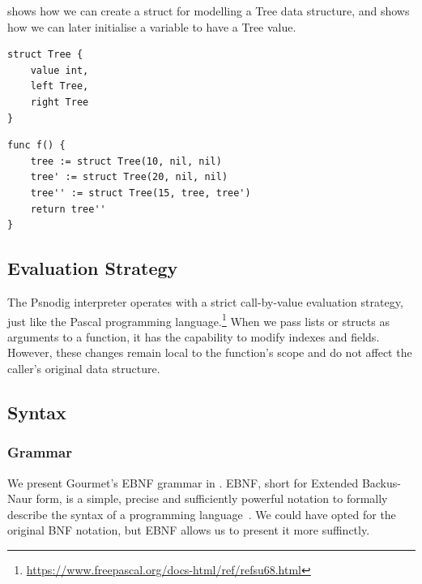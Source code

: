  shows how we can create a struct for modelling a Tree data structure, and  shows how we can later initialise a variable to have a Tree value. \\

\begin{lstlisting}[caption={A Gourmet struct Tree, with instance variables \texttt{value}, \texttt{left} and \texttt{right}.}, captionpos=b, label={Gourmet Tree}]
struct Tree {
    value int,
    left Tree,
    right Tree
}
\end{lstlisting}

\begin{lstlisting}[caption={A function to initialise three Tree structs and return the last one.},captionpos=b, label={A function to initialise three tree structs and return the last one.}]
func f() {
    tree := struct Tree(10, nil, nil)
    tree' := struct Tree(20, nil, nil)
    tree'' := struct Tree(15, tree, tree')
    return tree''
}
\end{lstlisting}

\subsection{Evaluation Strategy}

The Psnodig interpreter operates with a strict call-by-value evaluation strategy, just like the Pascal programming language.\footnote{\url{https://www.freepascal.org/docs-html/ref/refsu68.html}} When we pass lists or structs as arguments to a function, it has the capability to modify indexes and fields. However, these changes remain local to the function's scope and do not affect the caller's original data structure.

\subsection{Syntax}

\subsubsection{Grammar}

We present Gourmet's EBNF grammar in . EBNF, short for Extended Backus-Naur form, is a simple, precise and sufficiently powerful notation to formally describe the syntax of a programming language~\cite{whatIsEBNF}. We could have opted for the original BNF notation, but EBNF allows us to present it more suffinctly. \\

